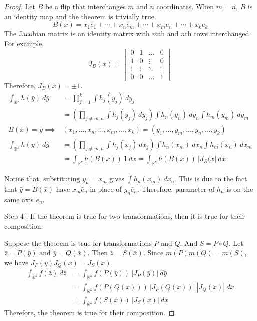 \begin{proof}
	Let $B$ be a flip that interchanges $m$ and $n$ coordinates.
	When $m = n$, $B$ is an identity map and the theorem is trivially true.
	\begin{equation}
		B(\bar{x}) = x_1\bar{e}_1 + \dotsb + x_n\bar{e}_m + \dotsb +  x_m\bar{e}_n + \dotsb + x_k\bar{e}_k
	\end{equation}
	The Jacobian matrix is an identity matrix with $m$th and $n$th rows interchanged.
	For example,
	\begin{equation}
		J_B(\bar{x}) = \begin{vmatrix}
			0 & 1 & \dots & 0 \\
			1 & 0 & \vdots & 0 \\
			\vdots & \vdots & \ddots & \vdots \\
			0 & 0 & \dots &  1
		\end{vmatrix}
	\end{equation}
	Therefore, $J_B(\bar{x}) = \pm 1$.
	\begin{align*}
		\int_{\mathbb{R}^k} h(\bar{y})\ d\bar{y} & = \prod_{j = 1}^k \int h_j(y_j)\ dy_j\\
		& = \left( \prod_{j \ne m,n} \int h_j(y_j)\ dy_j \right) \int h_n(y_n)\ dy_n \int h_m(y_m)\ dy_m \\
		B(\bar{x}) = \bar{y} \implies & (x_1,\dots,x_n,\dots,x_m,\dots,x_k) = (y_1,\dots,y_m,\dots,y_n,\dots,y_k)\\
		\int_{\mathbb{R}^k} h(\bar{y})\ d\bar{y} & = \left( \prod_{j \ne m,n} \int h_j(x_j)\ dx_j \right) \int h_n(x_m)\ dx_n \int h_m(x_n)\ dx_m \\
		& = \int_{\mathbb{R}^k} h(B(\bar{x}))\ 1\ d\bar{x} = \int_{\mathbb{R}^k} h(B(\bar{x}))\ |J_B(\bar{x}|\ d\bar{x}
	\end{align*}

	\begin{commentary}
		Notice that, substituting $y_n = x_m$ gives $\int h_n(x_m)\ dx_n$.
		This is due to the fact that $\bar{y} = B(\bar{x})$ have $x_m\bar{e}_n$ in place of $y_n\bar{e}_n$.
		Therefore, parameter of $h_n$ is on the same axis $\bar{e}_n$.

		Step 4 : If the theorem is true for two transformations, then it is true for their composition.
	\end{commentary}

	Suppose the theorem is true for transformations $P$ and $Q$.
	And $S = P \circ Q$.
	Let $\bar{z} = P(\bar{y})$ and $\bar{y} = Q(\bar{x})$.
	Then $\bar{z} = S(\bar{x})$.
	Since $m(P)m(Q) = m(S)$, we have $J_P(\bar{y}) J_Q(\bar{x}) = J_S(\bar{x})$.
	\begin{align*}
		\int_{\mathbb{R}^k} f(\bar{z})\ d\bar{z} & = \int_{\mathbb{R}^k} f(P(\bar{y}))\ |J_P(\bar{y})|\ d\bar{y} \\
		& = \int_{\mathbb{R}^k} f(P(Q(\bar{x})))\ |J_P(Q(\bar{x}))|\ |J_Q(\bar{x})|\ d\bar{x} \\
		& = \int_{\mathbb{R}^k} f(S(\bar{x}))\ |J_S(\bar{x})|\ d\bar{x}
	\end{align*}
	Therefore, the theorem is true for their composition.


\end{proof}
